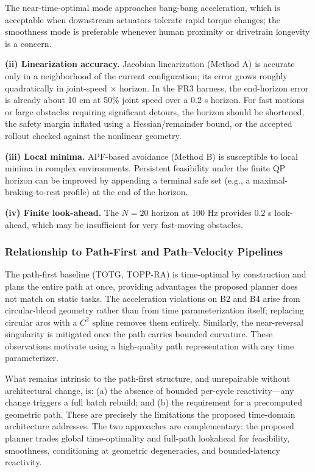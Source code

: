 The near-time-optimal mode approaches bang-bang acceleration, which is
acceptable when downstream actuators tolerate rapid torque changes; the
smoothness mode is preferable whenever human proximity or drivetrain
longevity is a concern.

\textbf{(ii) Linearization accuracy.} Jacobian linearization (Method A)
is accurate only in a neighborhood of the current configuration; its
error grows roughly quadratically in joint-speed × horizon. In the FR3
harness, the end-horizon error is already about 10 cm at 50\% joint
speed over a 0.2 s horizon. For fast motions or large obstacles
requiring significant detours, the horizon should be shortened, the
safety margin inflated using a Hessian/remainder bound, or the accepted
rollout checked against the nonlinear geometry.

\textbf{(iii) Local minima.} APF-based avoidance (Method B) is
susceptible to local minima in complex environments. Persistent
feasibility under the finite QP horizon can be improved by appending a
terminal safe set (e.g., a maximal-braking-to-rest profile) at the end
of the horizon.

\textbf{(iv) Finite look-ahead.} The \(N = 20\) horizon at 100 Hz
provides \(0.2\) s look-ahead, which may be insufficient for very
fast-moving obstacles.

\subsubsection{Relationship to Path-First and Path--Velocity
Pipelines}\label{relationship-to-path-first-and-pathvelocity-pipelines}

The path-first baseline (TOTG, TOPP-RA) is time-optimal by construction
and plans the entire path at once, providing advantages the proposed
planner does not match on static tasks. The acceleration violations on
B2 and B4 arise from circular-blend geometry rather than from time
parameterization itself; replacing circular arcs with a \(C^2\) spline
removes them entirely. Similarly, the near-reversal singularity is
mitigated once the path carries bounded curvature. These observations
motivate using a high-quality path representation with any time
parameterizer.

What remains intrinsic to the path-first structure, and unrepairable
without architectural change, is: (a) the absence of bounded per-cycle
reactivity---any change triggers a full batch rebuild; and (b) the
requirement for a precomputed geometric path. These are precisely the
limitations the proposed time-domain architecture addresses. The two
approaches are complementary: the proposed planner trades global
time-optimality and full-path lookahead for feasibility, smoothness,
conditioning at geometric degeneracies, and bounded-latency reactivity.

